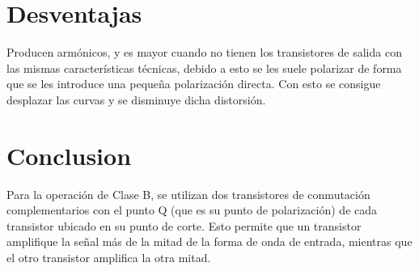 \documentclass[11pt,a4paper]{article}
\begin{document}
\section{Desventajas}

Producen armónicos, y es mayor cuando no tienen los transistores de salida con las mismas características técnicas, debido a esto se les suele polarizar de forma que se les introduce una pequeña polarización directa. Con esto se consigue desplazar las curvas y se disminuye dicha distorsión.\\

\section{Conclusion}
Para la operación de Clase B, se utilizan dos transistores de conmutación complementarios con el punto Q (que es su punto de polarización) de cada transistor ubicado en su punto de corte. Esto permite que un transistor amplifique la señal más de la mitad de la forma de onda de entrada, mientras que el otro transistor amplifica la otra mitad.
\end{document}
